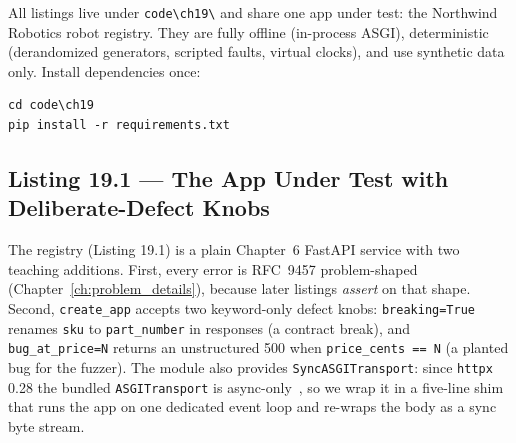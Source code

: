 All listings live under \texttt{code\textbackslash{}ch19\textbackslash{}}
and share one app under test: the Northwind Robotics robot registry. They
are fully offline (in-process ASGI), deterministic (derandomized
generators, scripted faults, virtual clocks), and use synthetic data only.
Install dependencies once:

\begin{verbatim}
cd code\ch19
pip install -r requirements.txt
\end{verbatim}

\subsection{Listing 19.1 --- The App Under Test with Deliberate-Defect Knobs}
\label{sec:ch19-listing-app}

The registry (Listing 19.1) is a plain Chapter~6 FastAPI service
with two teaching additions. First, every error is RFC~9457 problem-shaped
(Chapter~\ref{ch:problem_details}), because later listings \emph{assert} on
that shape. Second, \texttt{create\_app} accepts two keyword-only defect
knobs: \texttt{breaking=True} renames \texttt{sku} to
\texttt{part\_number} in responses (a contract break), and
\texttt{bug\_at\_price=N} returns an unstructured 500 when
\texttt{price\_cents == N} (a planted bug for the fuzzer). The module also
provides \texttt{SyncASGITransport}: since \texttt{httpx} 0.28 the bundled
\texttt{ASGITransport} is async-only~\cite{httpxdocs}, so we wrap it in a
five-line shim that runs the app on one dedicated event loop and re-wraps
the body as a sync byte stream.

